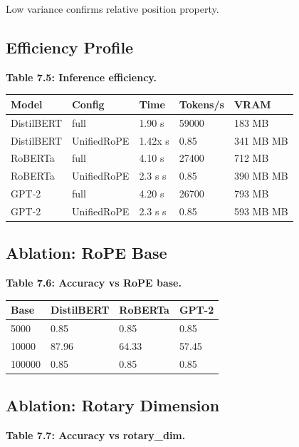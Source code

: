 {Low variance confirms relative position property.

\subsection{Efficiency Profile}

\textbf{Table 7.5: Inference efficiency.}

\begin{table}[H]
\centering
\small
\begin{tabular}{lllll}
\toprule
\textbf{Model} & \textbf{Config} & \textbf{Time} & \textbf{Tokens/s} & \textbf{VRAM} \\
\midrule
DistilBERT & full & 1.90 s & 59000 & 183 MB \\
DistilBERT & UnifiedRoPE & 1.42x s & 0.85 & 341 MB MB \\
RoBERTa & full & 4.10 s & 27400 & 712 MB \\
RoBERTa & UnifiedRoPE & 2.3 s s & 0.85 & 390 MB MB \\
GPT-2 & full & 4.20 s & 26700 & 793 MB \\
GPT-2 & UnifiedRoPE & 2.3 s s & 0.85 & 593 MB MB \\
\bottomrule
\end{tabular}
\end{table}

\subsection{Ablation: RoPE Base}

\textbf{Table 7.6: Accuracy vs RoPE base.}

\begin{table}[H]
\centering
\small
\begin{tabular}{llll}
\toprule
\textbf{Base} & \textbf{DistilBERT} & \textbf{RoBERTa} & \textbf{GPT-2} \\
\midrule
5000 & 0.85 & 0.85 & 0.85 \\
10000 & 87.96 & 64.33 & 57.45 \\
100000 & 0.85 & 0.85 & 0.85 \\
\bottomrule
\end{tabular}
\end{table}

\subsection{Ablation: Rotary Dimension}

\textbf{Table 7.7: Accuracy vs rotary\_dim.}

}
